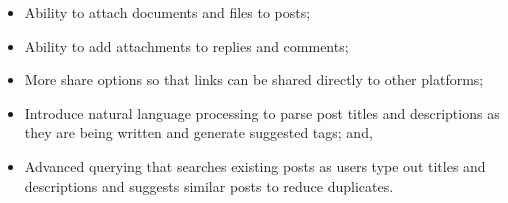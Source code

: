 \begin{itemize}
    \item Ability to attach documents and files to posts;
    \item Ability to add attachments to replies and comments;
    \item More share options so that links can be shared directly to other platforms;
    \item Introduce natural language processing to parse post titles and descriptions as they are being written and generate suggested tags; and,
    \item Advanced querying that searches existing posts as users type out titles and descriptions and suggests similar posts to reduce duplicates.
\end{itemize}